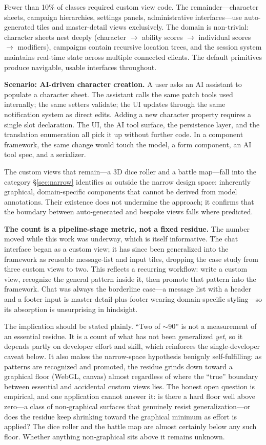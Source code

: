 \documentclass[sigplan,review,anonymous,10pt]{acmart}
\begin{document}
Fewer than 10\% of classes required custom view code. The remainder---character sheets, campaign hierarchies, settings panels, administrative interfaces---use auto-generated tiles and master-detail views exclusively. The domain is non-trivial: character sheets nest deeply (character $\rightarrow$ ability scores $\rightarrow$ individual scores $\rightarrow$ modifiers), campaigns contain recursive location trees, and the session system maintains real-time state across multiple connected clients. The default primitives produce navigable, usable interfaces throughout.

\textbf{Scenario: AI-driven character creation.} A user asks an AI assistant to populate a character sheet. The assistant calls the same patch tools used internally; the same setters validate; the UI updates through the same notification system as direct edits. Adding a new character property requires a single slot declaration. The UI, the AI tool surface, the persistence layer, and the translation enumeration all pick it up without further code. In a component framework, the same change would touch the model, a form component, an AI tool spec, and a serializer.

The custom views that remain---a 3D dice roller and a battle map---fall into the category \S\ref{sec:narrow} identifies as outside the narrow design space: inherently graphical, domain-specific components that cannot be derived from model annotations. Their existence does not undermine the approach; it confirms that the boundary between auto-generated and bespoke views falls where predicted.

\textbf{The count is a pipeline-stage metric, not a fixed residue.} The number moved while this work was underway, which is itself informative. The chat interface began as a custom view; it has since been generalized into the framework as reusable message-list and input tiles, dropping the case study from three custom views to two. This reflects a recurring workflow: write a custom view, recognize the general pattern inside it, then promote that pattern into the framework. Chat was always the borderline case---a message list with a header and a footer input is master-detail-plus-footer wearing domain-specific styling---so its absorption is unsurprising in hindsight.

The implication should be stated plainly. ``Two of $\sim$90'' is not a measurement of an essential residue. It is a count of what has not been generalized \emph{yet}, so it depends partly on developer effort and skill, which reinforces the single-developer caveat below. It also makes the narrow-space hypothesis benignly self-fulfilling: as patterns are recognized and promoted, the residue grinds down toward a graphical floor (WebGL, canvas) almost regardless of where the ``true'' boundary between essential and accidental custom views lies. The honest open question is empirical, and one application cannot answer it: is there a hard floor well above zero---a class of non-graphical surfaces that genuinely resist generalization---or does the residue keep shrinking toward the graphical minimum as effort is applied? The dice roller and the battle map are almost certainly below any such floor. Whether anything non-graphical sits above it remains unknown.
\end{document}
